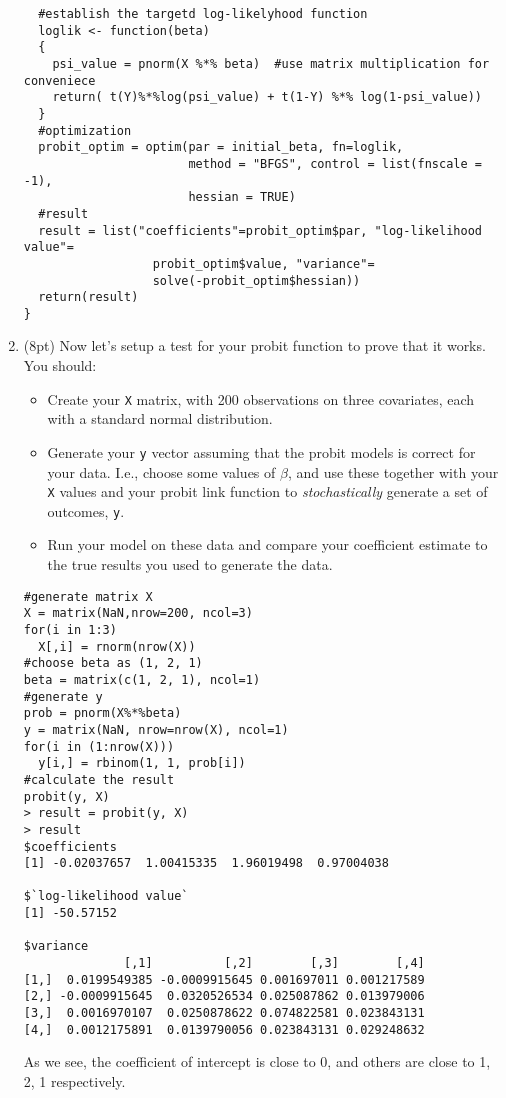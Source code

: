 \documentclass[11pt,english]{article}
\begin{document}
\begin{enumerate}
\begin{verbatim}
  #establish the targetd log-likelyhood function
  loglik <- function(beta)
  {
    psi_value = pnorm(X %*% beta)  #use matrix multiplication for conveniece
    return( t(Y)%*%log(psi_value) + t(1-Y) %*% log(1-psi_value))
  }
  #optimization
  probit_optim = optim(par = initial_beta, fn=loglik,
                       method = "BFGS", control = list(fnscale = -1),
                       hessian = TRUE)
  #result
  result = list("coefficients"=probit_optim$par, "log-likelihood value"=
                  probit_optim$value, "variance"=
                  solve(-probit_optim$hessian))
  return(result)
}
\end{verbatim}



\item (8pt) Now let's setup a test for your probit function to prove that it works. You should:
\begin{itemize}
\item Create your \texttt{X} matrix, with 200 observations on three covariates, each with a standard normal distribution.
\item Generate your \texttt{y} vector assuming that the probit models is correct for your data.  I.e., choose some values of $\beta$, and use these together with your \texttt{X} values and your probit link function to \textit{stochastically} generate a set of outcomes, \texttt{y}.
\item Run your model on these data and compare your coefficient estimate to the true results you used to generate the data.
\end{itemize}
\begin{verbatim}
#generate matrix X
X = matrix(NaN,nrow=200, ncol=3)
for(i in 1:3)
  X[,i] = rnorm(nrow(X))
#choose beta as (1, 2, 1)
beta = matrix(c(1, 2, 1), ncol=1)
#generate y
prob = pnorm(X%*%beta)
y = matrix(NaN, nrow=nrow(X), ncol=1)
for(i in (1:nrow(X)))
  y[i,] = rbinom(1, 1, prob[i])
#calculate the result
probit(y, X)
> result = probit(y, X)
> result
$coefficients
[1] -0.02037657  1.00415335  1.96019498  0.97004038

$`log-likelihood value`
[1] -50.57152

$variance
              [,1]          [,2]        [,3]        [,4]
[1,]  0.0199549385 -0.0009915645 0.001697011 0.001217589
[2,] -0.0009915645  0.0320526534 0.025087862 0.013979006
[3,]  0.0016970107  0.0250878622 0.074822581 0.023843131
[4,]  0.0012175891  0.0139790056 0.023843131 0.029248632
\end{verbatim}
As  we see, the coefficient of intercept is close to 0, and others are close to 1, 2, 1 respectively.\\



\end{enumerate}
\end{document}
